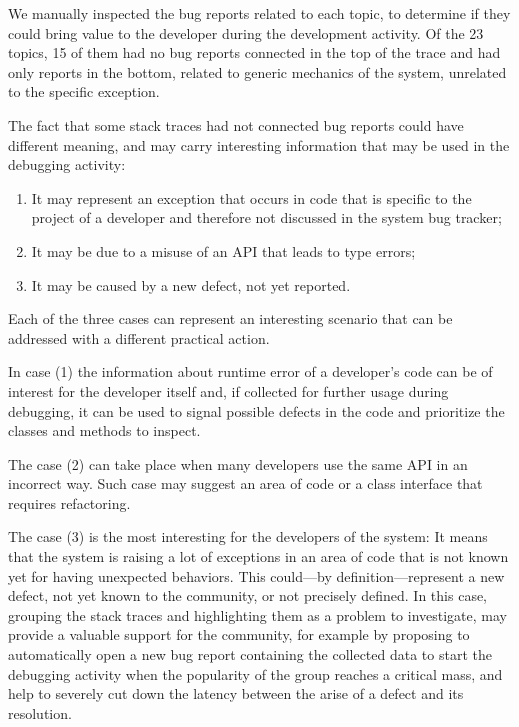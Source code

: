 We manually inspected the bug reports related to each topic, to determine if they could bring value to the developer during the development activity.
Of the 23 topics, 15 of them had no bug reports connected in the top of the trace and had only reports in the bottom, related to generic mechanics of the system, unrelated to the specific exception.

The fact that some stack traces had not connected bug reports could have different meaning, and may carry interesting information that may be used in the debugging activity:

\begin{enumerate}%

\item It may represent an exception that occurs in code that is specific to the project of a developer and therefore not discussed in the system bug tracker;

\item It may be due to a misuse of an API that leads to type errors;

\item It may be caused by a new defect, not yet reported.

\end{enumerate}

Each of the three cases can represent an interesting scenario that can be addressed with a different practical action.

In case (1) the information about runtime error of a developer's code can be of interest for the developer itself and, if collected for further usage during debugging, it can be used to signal possible defects in the code and prioritize the classes and methods to inspect.

The case (2) can take place when many developers use the same API in an incorrect way.
Such case may suggest an area of code or a class interface that requires refactoring.

The case (3) is the most interesting for the developers of the system: It means that the system is raising a lot of exceptions in an area of code that is not known yet for having unexpected behaviors.
This could---by definition---represent a new defect, not yet known to the community, or not precisely defined.
In this case, grouping the stack traces and highlighting them as a problem to investigate, may provide a valuable support for the community, for example by proposing to automatically open a new bug report containing the collected data to start the debugging activity when the popularity of the group reaches a critical mass, and help to severely cut down the latency between the arise of a defect and its resolution.

